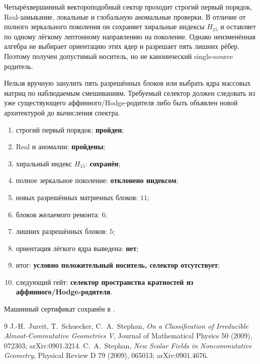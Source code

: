 \begin{theorem}
Четырёхвершинный вектороподобный сектор проходит строгий первый порядок,
Real-замыкание, локальные и глобальную аномальные проверки. В отличие от
полного зеркального поколения он сохраняет хиральные индексы $H_{15}$ и
оставляет по одному лёгкому лептонному направлению на поколение. Однако
неизменённая алгебра не выбирает ориентацию этих ядер и разрешает пять
лишних рёбер. Поэтому получен допустимый носитель, но не канонический
single-source родитель.
\end{theorem}

\begin{nogocriterion}
Нельзя вручную занулить пять разрешённых блоков или выбрать ядра массовых
матриц по наблюдаемым смешиваниям. Требуемый селектор должен следовать из
уже существующего аффинного/Hodge-родителя либо быть объявлен новой
архитектурой до вычисления спектра.
\end{nogocriterion}

\begin{protocol}
\begin{enumerate}
 \item строгий первый порядок: \textbf{пройден};
 \item Real и аномалии: \textbf{пройдены};
 \item хиральный индекс $H_{15}$: \textbf{сохранён};
 \item полное зеркальное поколение: \textbf{отклонено индексом};
 \item новых разрешённых матричных блоков: \textbf{$11$};
 \item блоков желаемого ремонта: \textbf{$6$};
 \item лишних разрешённых блоков: \textbf{$5$};
 \item ориентация лёгкого ядра выведена: \textbf{нет};
 \item итог: \textbf{условно положительный носитель, селектор отсутствует};
 \item следующий гейт: \textbf{селектор пространства кратностей из
 аффинного/Hodge-родителя}.
\end{enumerate}
\end{protocol}

Машинный сертификат сохранён в
.

\begin{thebibliography}{9}
J.-H.~Jureit, T.~Schuecker, C.~A.~Stephan,
\emph{On a Classification of Irreducible Almost-Commutative Geometries V},
Journal of Mathematical Physics 50 (2009), 072303; arXiv:0901.3214.
C.~A.~Stephan,
\emph{New Scalar Fields in Noncommutative Geometry},
Physical Review D 79 (2009), 065013; arXiv:0901.4676.
\end{thebibliography}